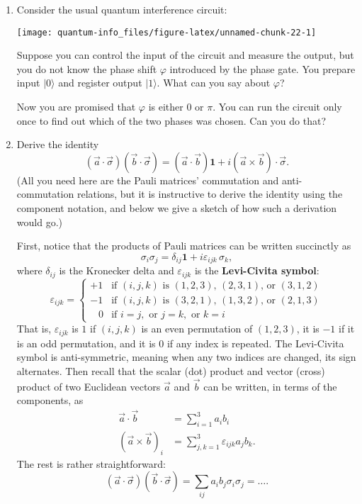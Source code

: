 \documentclass[fleqn]{article}
\begin{document}
\begin{enumerate}
\def\labelenumi{\arabic{enumi}.}
\item
  Consider the usual quantum interference circuit:

  \begin{center}\texttt{[image: quantum-info\_files/figure-latex/unnamed-chunk-22-1]} \end{center}

  Suppose you can control the input of the circuit and measure the output, but you do not know the phase shift \(\varphi\) introduced by the phase gate.
  You prepare input \(|0\rangle\) and register output \(|1\rangle\).
  What can you say about \(\varphi\)?

  Now you are promised that \(\varphi\) is either \(0\) or \(\pi\).
  You can run the circuit only once to find out which of the two phases was chosen.
  Can you do that?
\item
  Derive the identity
  \[
     (\vec{a}\cdot\vec{\sigma})(\vec{b}\cdot\vec{\sigma})
     = (\vec{a}\cdot\vec{b})\mathbf{1}+ i(\vec{a}\times \vec{b})\cdot \vec{\sigma}.
   \]
  (All you need here are the Pauli matrices' commutation and anti-commutation relations, but it is instructive to derive the identity using the component notation, and below we give a sketch of how such a derivation would go.)

  First, notice that the products of Pauli matrices can be written succinctly as
  \[
    \sigma_{i}\sigma_{j}
    = \delta _{ij}\mathbf{1}+ i\varepsilon_{ijk}\,\sigma _{k},
   \]
  where \(\delta_{ij}\) is the Kronecker delta and \(\varepsilon_{ijk}\) is the \textbf{Levi-Civita symbol}:
  \[
    \varepsilon_{ijk}
    = \begin{cases}
     +1 & {\text{if }}(i,j,k){\text{ is }}(1,2,3)\text{, }(2,3,1){\text{, or }}(3,1,2)
   \\-1 & {\text{if }}(i,j,k){\text{ is }}(3,2,1)\text{, }(1,3,2){\text{, or }}(2,1,3)
   \\\;\;\;0 & {\text{if }}i=j,{\text{ or }}j=k,{\text{ or }}k=i
   \end{cases}
   \]
  That is, \(\varepsilon _{ijk}\) is \(1\) if \((i, j, k)\) is an even permutation of \((1, 2, 3)\), it is \(-1\) if it is an odd permutation, and it is \(0\) if any index is repeated.
  The Levi-Civita symbol is anti-symmetric, meaning when any two indices are changed, its sign alternates.
  Then recall that the scalar (dot) product and vector (cross) product of two Euclidean vectors \(\vec{a}\) and \(\vec{b}\) can be written, in terms of the components, as
  \[
     \begin{aligned}
       \vec{a}\cdot\vec{b}
       &= \sum_{i=1}^3 a_i b_i
     \\(\vec{a}\times\vec{b})_i
       &= \sum_{j,k=1}^3 \varepsilon_{ijk}a_jb_k.
     \end{aligned}
   \]
  The rest is rather straightforward:
  \[
     (\vec{a}\cdot\vec{\sigma})(\vec{b}\cdot\vec{\sigma})
     = \sum_{ij}a_i b_j\sigma_i\sigma_j
     = \ldots.
   \]
\end{enumerate}
\end{document}
